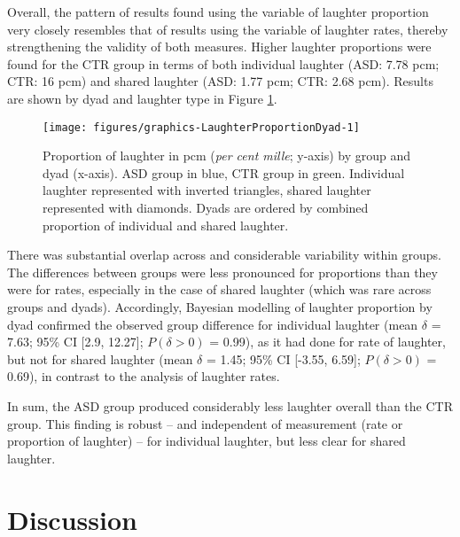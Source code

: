 Overall, the pattern of results found using the variable of laughter proportion very closely resembles that of results using the variable of laughter rates, thereby strengthening the validity of both measures. Higher laughter proportions were found for the CTR group in terms of both individual laughter (ASD: 7.78 pcm; CTR: 16 pcm) and shared laughter (ASD: 1.77 pcm; CTR: 2.68 pcm). Results are shown by dyad and laughter type in Figure \ref{fig:LaughterProportionDyad}.



\begin{figure}

{\texttt{[image: figures/graphics-LaughterProportionDyad-1]}
	
}

\caption{Proportion of laughter in pcm (\emph{per cent mille}; y-axis) by group and dyad (x-axis). ASD group in blue, CTR group in green. Individual laughter represented with inverted triangles, shared laughter represented with diamonds. Dyads are ordered by combined proportion of individual and shared laughter.}\label{fig:LaughterProportionDyad}
\end{figure}

\hspace*{-4.1pt}There was substantial overlap across and considerable variability within groups. The differences between groups were less pronounced for proportions than they were for rates, especially in the case of shared laughter (which was rare across groups and dyads). Accordingly, Bayesian modelling of laughter proportion by dyad confirmed the observed group difference for individual laughter (mean \(\delta\) = 7.63; 95\% CI {[}2.9, 12.27{]}; \(P(\delta > 0)\) = 0.99), as it had done for rate of laughter, but not for shared laughter (mean \(\delta\) = 1.45; 95\% CI {[}-3.55, 6.59{]}; \(P(\delta > 0)\) = 0.69), in contrast to the analysis of laughter rates.

In sum, the ASD group produced considerably less laughter overall than the CTR group. This finding is robust -- and independent of measurement (rate or proportion of laughter) -- for individual laughter, but less clear for shared laughter.











\section{Discussion}\label{sec:BCFP_Discussion}

